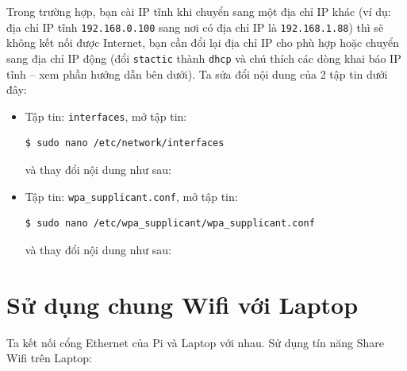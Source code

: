 Trong trường hợp, bạn cài IP tĩnh khi chuyển sang một địa chỉ IP khác (ví dụ: địa chỉ IP tĩnh \verb|192.168.0.100| sang nơi có địa chỉ IP là \verb|192.168.1.88|) thì sẽ không kết nối được Internet, bạn cần đổi lại địa chỉ IP cho phù hợp hoặc chuyển sang địa chỉ IP động (đổi \verb|stactic| thành \verb|dhcp| và chú thích các dòng khai báo IP tĩnh -- xem phần hướng dẫn bên dưới).
Ta sửa đổi nội dung của 2 tập tin dưới đây:
\begin{itemize}
\item Tập tin: \verb|interfaces|, mở tập tin:
\begin{lstlisting}[language=bash]
$ sudo nano /etc/network/interfaces
\end{lstlisting}
và thay đổi nội dung như sau:

\item Tập tin: \verb|wpa_supplicant.conf|,  mở tập tin:
\begin{lstlisting}[language=bash]
$ sudo nano /etc/wpa_supplicant/wpa_supplicant.conf
\end{lstlisting}
và thay đổi nội dung như sau:

\end{itemize}
\section{Sử dụng chung Wifi với Laptop}
Ta kết nối cổng Ethernet của Pi và Laptop với nhau. Sử dụng tín năng Share Wifi trên Laptop:
